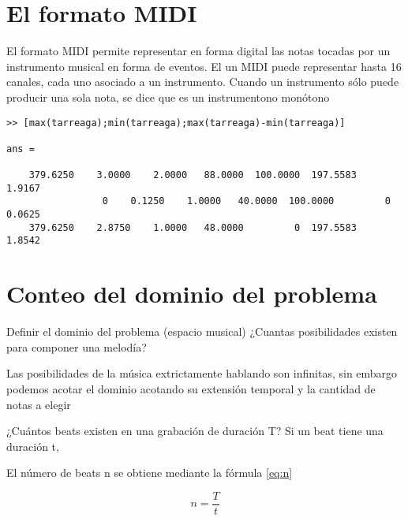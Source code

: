 \section{El formato MIDI}
	El formato MIDI permite representar en forma digital las notas tocadas por un instrumento musical en forma de eventos. El un MIDI puede representar hasta 16 canales, cada uno asociado a un instrumento. Cuando un instrumento sólo puede producir una sola nota, se dice que es un instrumentono monótono

\begin{verbatim}
>> [max(tarreaga);min(tarreaga);max(tarreaga)-min(tarreaga)]

ans =

	379.6250    3.0000    2.0000   88.0000  100.0000  197.5583    1.9167
				 0    0.1250    1.0000   40.0000  100.0000         0    0.0625
	379.6250    2.8750    1.0000   48.0000         0  197.5583    1.8542
\end{verbatim}

\section {Conteo del dominio del problema}
  Definir el dominio del problema (espacio musical)
    ¿Cuantas posibilidades existen para componer una melodía?

    Las posibilidades de la música extrictamente hablando son infinitas, sin embargo podemos acotar el dominio acotando su extensión temporal y la cantidad de notas a elegir

    ¿Cuántos beats existen en una grabación de duración T?
      Si un beat tiene una duración t,

		El número de beats n se obtiene mediante la fórmula \eqref{eq:n}

			\begin{equation} \label{eq:n}
				n = \frac{T}{t}
			\end{equation}
